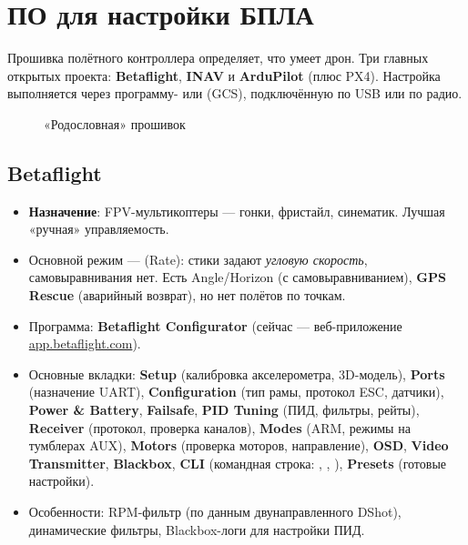 \section{ПО для настройки БПЛА}

Прошивка полётного контроллера определяет, что умеет дрон. Три главных открытых проекта: \textbf{Betaflight}, \textbf{INAV} и \textbf{ArduPilot} (плюс PX4). Настройка выполняется через программу- или  (GCS), подключённую по USB или по радио.

\begin{figure}[H]\centering
{}
\caption{«Родословная» прошивок}
\end{figure}

\subsection{Betaflight}
\begin{itemize}
\item \textbf{Назначение}: FPV-мультикоптеры — гонки, фристайл, синематик. Лучшая «ручная» управляемость.
\item Основной режим —  (Rate): стики задают \emph{угловую скорость}, самовыравнивания нет. Есть Angle/Horizon (с самовыравниванием), \textbf{GPS Rescue} (аварийный возврат), но нет полётов по точкам.
\item Программа: \textbf{Betaflight Configurator} (сейчас — веб-приложение \url{app.betaflight.com}).
\item Основные вкладки: \textbf{Setup} (калибровка акселерометра, 3D-модель), \textbf{Ports} (назначение UART), \textbf{Configuration} (тип рамы, протокол ESC, датчики), \textbf{Power \& Battery}, \textbf{Failsafe}, \textbf{PID Tuning} (ПИД, фильтры, рейты), \textbf{Receiver} (протокол, проверка каналов), \textbf{Modes} (ARM, режимы на тумблерах AUX), \textbf{Motors} (проверка моторов, направление), \textbf{OSD}, \textbf{Video Transmitter}, \textbf{Blackbox}, \textbf{CLI} (командная строка: , , ), \textbf{Presets} (готовые настройки).
\item Особенности: RPM-фильтр (по данным двунаправленного DShot), динамические фильтры, Blackbox-логи для настройки ПИД.
\end{itemize}

